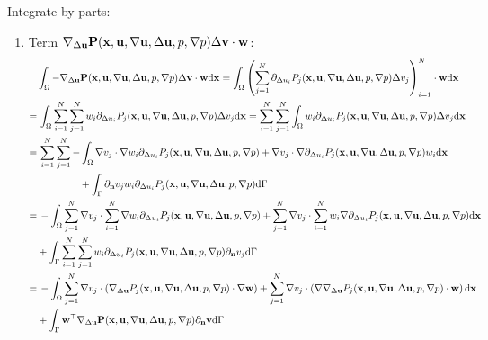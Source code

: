 \documentclass[oneside,11pt]{book}
\numberwithin{equation}{section}
\begin{document}
Integrate by parts:
\begin{enumerate}[leftmargin=0in]
    \item Term $\nabla_{\Delta{\bf u}}{\bf P}({\bf x},{\bf u},\nabla{\bf u},\Delta{\bf u},p,\nabla p)\Delta{\bf v}\cdot{\bf w}$:
    \begin{align*}
        &\int_\Omega -\nabla_{\Delta{\bf u}}{\bf P}({\bf x},{\bf u},\nabla{\bf u},\Delta{\bf u},p,\nabla p)\Delta{\bf v}\cdot{\bf w}{\rm d}{\bf x} = \int_\Omega \left(\sum_{j=1}^N \partial_{\Delta u_i}P_j({\bf x},{\bf u},\nabla{\bf u},\Delta{\bf u},p,\nabla p)\Delta v_j\right)_{i=1}^N\cdot{\bf w}{\rm d}{\bf x}\\
        =&\, \int_\Omega \sum_{i=1}^N\sum_{j=1}^N w_i\partial_{\Delta u_i}P_j({\bf x},{\bf u},\nabla{\bf u},\Delta{\bf u},p,\nabla p)\Delta v_j{\rm d}{\bf x} = \sum_{i=1}^N\sum_{j=1}^N \int_\Omega w_i\partial_{\Delta u_i}P_j({\bf x},{\bf u},\nabla{\bf u},\Delta{\bf u},p,\nabla p)\Delta v_j{\rm d}{\bf x}\\
        =&\, \sum_{i=1}^N\sum_{j=1}^N -\int_\Omega \nabla v_j\cdot\nabla w_i\partial_{\Delta u_i}P_j({\bf x},{\bf u},\nabla{\bf u},\Delta{\bf u},p,\nabla p) + \nabla v_j\cdot\nabla\partial_{\Delta u_i}P_j({\bf x},{\bf u},\nabla{\bf u},\Delta{\bf u},p,\nabla p)w_i{\rm d}{\bf x}\\
        &\hspace{15mm}+ \int_\Gamma \partial_{\bf n}v_jw_i\partial_{\Delta u_i}P_j({\bf x},{\bf u},\nabla{\bf u},\Delta{\bf u},p,\nabla p){\rm d}\Gamma\\
        =&\, -\int_\Omega \sum_{j=1}^N \nabla v_j\cdot\sum_{i=1}^N \nabla w_i\partial_{\Delta u_i}P_j({\bf x},{\bf u},\nabla{\bf u},\Delta{\bf u},p,\nabla p) + \sum_{j=1}^N \nabla v_j\cdot\sum_{i=1}^N w_i\nabla\partial_{\Delta u_i}P_j({\bf x},{\bf u},\nabla{\bf u},\Delta{\bf u},p,\nabla p){\rm d}{\bf x}\\
        &+ \int_\Gamma \sum_{i=1}^N\sum_{j=1}^N w_i\partial_{\Delta u_i}P_j({\bf x},{\bf u},\nabla{\bf u},\Delta{\bf u},p,\nabla p)\partial_{\bf n}v_j{\rm d}\Gamma\\
        =&\, -\int_\Omega \sum_{j=1}^N \nabla v_j\cdot\left(\nabla_{\Delta{\bf u}}P_j({\bf x},{\bf u},\nabla{\bf u},\Delta{\bf u},p,\nabla p)\cdot\nabla{\bf w}\right) + \sum_{j=1}^N \nabla v_j\cdot\left(\nabla\nabla_{\Delta{\bf u}}P_j({\bf x},{\bf u},\nabla{\bf u},\Delta{\bf u},p,\nabla p)\cdot{\bf w}\right){\rm d}{\bf x}\\
        &+ \int_\Gamma {\bf w}^\top\nabla_{\Delta{\bf u}}{\bf P}({\bf x},{\bf u},\nabla{\bf u},\Delta{\bf u},p,\nabla p)\partial_{\bf n}{\bf v}{\rm d}\Gamma\\

\end{align*}
\end{enumerate}
\end{document}
